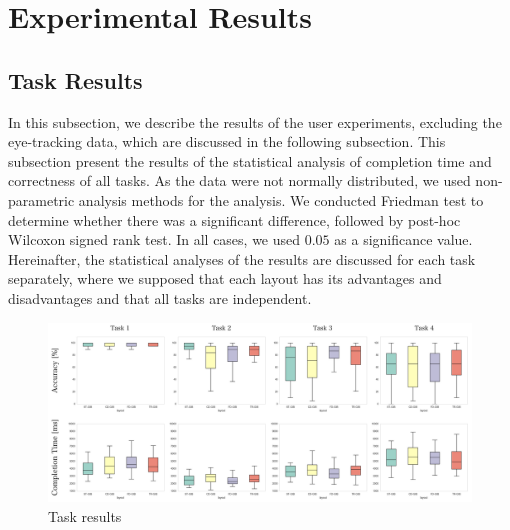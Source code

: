 \documentclass{vgtc}                          %
\begin{document}
\section{Experimental Results}

\subsection{Task Results}
\label{taskResult}

In this subsection, we describe the results of the user experiments, excluding the eye-tracking data, which are discussed in the following subsection.
This subsection present the results of the statistical analysis of completion time and correctness of all tasks.
As the data were not normally distributed, we used non-parametric analysis methods for the analysis.
We conducted Friedman test to determine whether there was a significant difference, followed by post-hoc Wilcoxon signed rank test. In all cases, we used $0.05$ as a significance value.
Hereinafter, the statistical analyses of the results are discussed for each task separately, where we supposed that each layout has its advantages and disadvantages and that all tasks are independent.

\begin{figure}[t]
  \begin{center}
    \includegraphics[width=1\textwidth]{pictures/results.png}
    \caption{Task results}
    \label{results}
  \end{center}
\end{figure}

\end{document}
